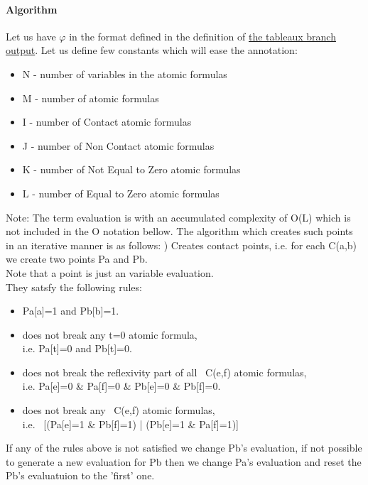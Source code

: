 \documentclass{article}
\begin{document}
			\paragraph{Algorithm}
			Let us have $\varphi$ in the format defined in the definition of \hyperref[tableaux:branch:output]{the tableaux branch output}. %
			Let us define few constants which will ease the annotation:
			\begin{itemize}
				\item N - number of variables in the atomic formulas
				\item M - number of atomic formulas
				\item I - number of Contact atomic formulas
				\item J - number of Non Contact atomic formulas
				\item K - number of Not Equal to Zero atomic formulas
				\item L - number of Equal to Zero atomic formulas
			\end{itemize}
			
			Note: The term evaluation is with an accumulated complexity of O(L) which is not included in the O notation bellow.
			\newline
			\newline
			The algorithm which creates such points in an iterative manner is as follows:
			) Creates contact points, i.e. for each C(a,b) we create two points Pa and Pb.  \\
				Note that a point is just an variable evaluation. \\
				They satsfy the following rules: 
				\begin{itemize}
					\item Pa[a]=1 and Pb[b]=1.
					\item does not break any t=0 atomic formula, \\
						i.e. Pa[t]=0 and Pb[t]=0.
					\item does not break the reflexivity part of all ~C(e,f) atomic formulas, \\
						i.e. Pa[e]=0 \& Pa[f]=0 \& Pb[e]=0 \& Pb[f]=0.
					\item does not break any ~C(e,f) atomic formulas, \\
						i.e. ~[(Pa[e]=1 \& Pb[f]=1) | (Pb[e]=1 \& Pa[f]=1)]
				\end{itemize}
				
				If any of the rules above is not satisfied we change Pb's evaluation, 
				if not possible to generate a new evaluation for Pb then we change 
				Pa's evaluation and reset the Pb's evaluatuion to the 'first' one.
\end{document}
